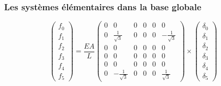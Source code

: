 \documentclass{beamer}
\begin{document}
\begin{frame}
\frametitle{Les systèmes élémentaires dans la base globale}
\[\left(\begin{array}{r}f_0\\ f_1\\f_2\\f_3\\f_4\\f_5 \end{array}\right) 
=\frac{EA}{L} \left(\begin{array}{rrccrr} 
0&0&0&0&0&0\\
0&\frac{1}{\sqrt 3}&0&0&0&-\frac{1}{\sqrt 3}\\
0&0&0&0&0&0\\
0&0&0&0&0&0\\
0&0&0&0&0&0\\
0&-\frac{1}{\sqrt 3}&0&0&0&\frac{1}{\sqrt 3}
\end{array}\right)
\times
\left(\begin{array}{r}  \delta_0\\ \delta_1\\ \delta_2\\ \delta_3\\ \delta_4\\ \delta_5   \end{array}\right)
\]
\end{frame}
\end{document}
